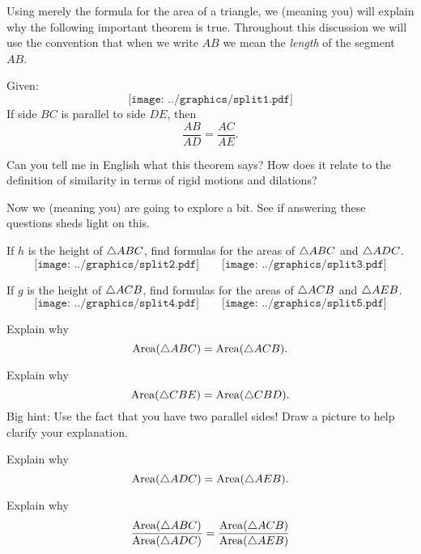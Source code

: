 Using merely the formula for the area of a triangle, we (meaning you)
will explain why the following important theorem is true. Throughout this 
discussion we will use the convention that when we
write $AB$ we mean the \textit{length} of the segment $AB$.


\begin{theorem} 
Given:
\[
\texttt{[image: ../graphics/split1.pdf]}
\]
If side $BC$ is parallel to side $DE$, then
\[
\frac{AB}{AD} = \frac{AC}{AE}.
\] 
\end{theorem}

\begin{question}
Can you tell me in English what this theorem says?  How does it relate to the definition of similarity in terms of rigid motions and dilations?  
\end{question}
\QM

Now we (meaning you) are going to explore a bit. See if answering
these questions sheds light on this.

\begin{question} 
If $h$ is the height of $\triangle ABC$, find formulas for the areas of
$\triangle ABC$ and $\triangle ADC$.
\[
\texttt{[image: ../graphics/split2.pdf]} \qquad \texttt{[image: ../graphics/split3.pdf]}
\]
\end{question}
\QM

\begin{question} 
If $g$ is the height of $\triangle ACB$, find formulas for the areas of
$\triangle ACB$ and $\triangle AEB$.
\[
\texttt{[image: ../graphics/split4.pdf]} \qquad \texttt{[image: ../graphics/split5.pdf]}
\]
\end{question}
\QM


\begin{question} Explain why 
\[
\mathrm{Area}(\triangle ABC) = \mathrm{Area}(\triangle ACB).
\]
\end{question}
\QM

\begin{question} Explain why 
\[
\mathrm{Area}(\triangle CBE) = \mathrm{Area}(\triangle CBD).
\]
Big hint: Use the fact that you have two parallel sides! Draw a
picture to help clarify your explanation.
\end{question}
\QM

\begin{question} Explain why 
\[
\mathrm{Area}(\triangle ADC)= \mathrm{Area}(\triangle AEB).
\]
\end{question}
\QM

\begin{question}
Explain why
\[
\frac{\mathrm{Area}(\triangle ABC)}{\mathrm{Area}(\triangle ADC)} = \frac{ \mathrm{Area}(\triangle ACB)}{\mathrm{Area}(\triangle AEB)}
\]
\end{question}
\QM

